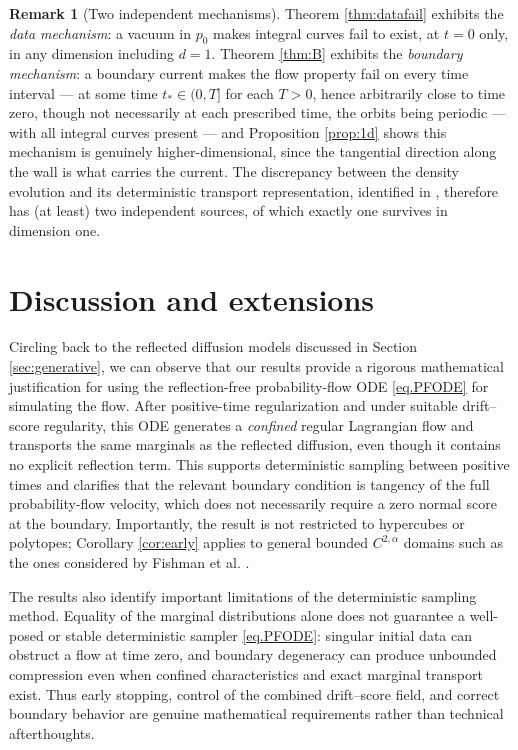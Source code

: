 \documentclass[11pt]{amsart}
\theoremstyle{definition}
\newtheorem{remark}[theorem]{Remark}
\begin{document}
\begin{remark}[Two independent mechanisms]\label{rem:mechanisms}
Theorem \ref{thm:datafail} exhibits the \emph{data mechanism}: a
vacuum in $p_0$ makes integral curves fail to exist, at $t=0$ only,
in any dimension including $d=1$. Theorem \ref{thm:B} exhibits the
\emph{boundary mechanism}: a boundary current makes the flow
property fail on every time interval --- at some time $t_*\in(0,T]$
for each $T>0$, hence arbitrarily close to time zero, though not
necessarily at each prescribed time, the orbits being periodic ---
with all integral curves present --- and Proposition \ref{prop:1d} shows this mechanism is
genuinely higher-dimensional, since the tangential direction along
the wall is what carries the current. The discrepancy between the
density evolution and its deterministic transport representation,
identified in \cite{pfode}, therefore has (at least) two independent
sources, of which exactly one survives in dimension one.
\end{remark}
\newpage
\section{Discussion and extensions}\label{sec:open}
Circling back to the reflected diffusion models discussed in Section \ref{sec:generative},
we can observe that our results 
provide a rigorous mathematical justification for using the reflection-free probability-flow ODE \eqref{eq.PFODE} for simulating the flow.
After positive-time regularization and under suitable drift–score regularity, this ODE generates a {\it confined} regular Lagrangian flow and transports the same marginals as the reflected diffusion, even though it contains no explicit reflection term. This supports deterministic sampling between positive times and clarifies that the relevant boundary condition is tangency of the full probability-flow velocity, which does not necessarily require a zero normal score at the boundary. 
Importantly, the result is not restricted to hypercubes or polytopes; Corollary \ref{cor:early} applies to general bounded $C^{2,\alpha}$
 domains such as the ones considered by Fishman et al. \cite{fishman2024}.
 
The results also identify important limitations of the deterministic sampling method. Equality of the marginal distributions alone does not guarantee a well-posed or stable deterministic sampler \eqref{eq.PFODE}: singular initial data can obstruct a flow at time zero, and boundary degeneracy can produce unbounded compression even when confined characteristics and exact marginal transport exist. Thus early stopping, control of the combined drift–score field, and correct boundary behavior are genuine mathematical requirements rather than technical afterthoughts.
\end{document}
